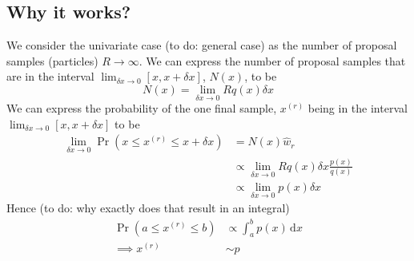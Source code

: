 \subsection{Why it works?}
We consider the univariate case (to do: general case) as the number of proposal samples (particles) $R \to \infty$. We can express the number of proposal samples that are in the interval $\lim_{\delta x \to 0}[x, x + \delta x]$, $N(x)$, to be
\begin{equation}
    N(x) = \lim_{\delta x \to 0} R q(x) \delta x
\end{equation}
We can express the probability of the one final sample, $x^{(r)}$ being in the interval $\lim_{\delta x \to 0}[x, x + \delta x]$ to be
\begin{align}
    \lim_{\delta x \to 0} \Pr(x \leq x^{(r)} \leq x + \delta x) &= N(x) \hat w_r \\
                                                                &\propto \lim_{\delta x \to 0} R q(x) \delta x \frac{p(x)}{q(x)} \\
                                                                &\propto \lim_{\delta x \to 0} p(x) \delta x
\end{align}
Hence (to do: why exactly does that result in an integral)
\begin{align}
    \Pr(a \leq x^{(r)} \leq b)  &\propto \int_a^b p(x) \,\mathrm d x \\
    \implies x^{(r)}            &\sim p
\end{align}